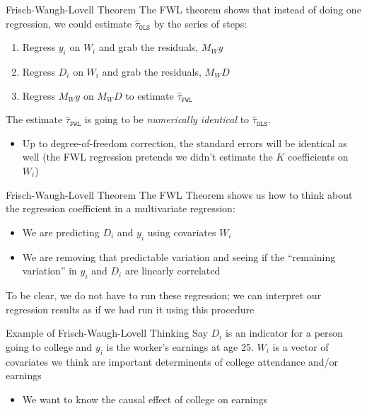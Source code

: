 \documentclass[aspectratio=169,t,11pt,table]{beamer}
\begin{document}
\begin{frame}{Frisch-Waugh-Lovell Theorem}
  The \alert{FWL theorem} shows that instead of doing one regression, we could estimate $\hat{\tau}_{\texttt{OLS}}$ by the series of steps:
  \begin{enumerate}
    \item Regress $y_i$ on $W_i$ and grab the residuals, $M_W y$
    \item Regress $D_i$ on $W_i$ and grab the residuals, $M_W D$
    \item Regress $M_W y$ on $M_W D$ to estimate $\hat{\tau}_{\texttt{FWL}}$
  \end{enumerate}

  \bigskip
  \pause
  The estimate $\hat{\tau}_{\texttt{FWL}}$ is going to be \emph{numerically identical} to $\hat{\tau}_{\texttt{OLS}}$.
  \begin{itemize}
    \item Up to degree-of-freedom correction, the standard errors will be identical as well (the FWL regression pretends we didn't estimate the $K$ coefficients on $W_i$)
  \end{itemize}
\end{frame}

\begin{frame}{Frisch-Waugh-Lovell Theorem}
  The FWL Theorem shows us how to think about the regression coefficient in a multivariate regression:
  \begin{itemize}
    \item We are predicting $D_i$ and $y_i$ using covariates $W_i$
    \item We are removing that predictable variation and seeing if the ``remaining variation'' in $y_i$ and $D_i$ are linearly correlated
  \end{itemize}

  \pause
  \bigskip
  To be clear, we do not have to run these regression; we can interpret our regression results as if we had run it using this procedure
\end{frame}

\begin{frame}{Example of Frisch-Waugh-Lovell Thinking}
  Say $D_i$ is an indicator for a person going to college and $y_i$ is the worker's earnings at age 25. $W_i$ is a vector of covariates we think are important determinents of college attendance and/or earnings
  \begin{itemize}
    \item We want to know the causal effect of college on earnings
  \end{itemize}

\end{frame}
\end{document}
